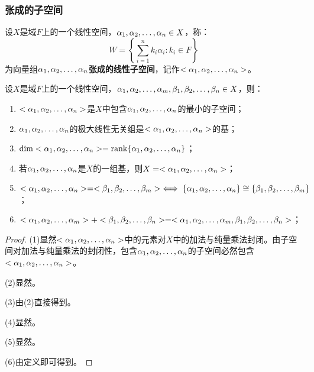 \subsubsection{张成的子空间}
\begin{definition}
	设$X$是域$F$上的一个线性空间，$\alpha_1, \alpha_2, \dots, \alpha_{n}\in X$，称：
	\begin{equation*}
		W=\left\{\sum_{i=1}^{n}k_i\alpha_i:k_i\in F\right\}
	\end{equation*}
	为向量组$\alpha_1, \alpha_2, \dots, \alpha_{n}$\textbf{张成的线性子空间}，记作$<\alpha_1, \alpha_2, \dots, \alpha_{n}>$。
\end{definition}
\begin{property}\label{prop:SpanSubspace}
	设$X$是域$F$上的一个线性空间，$\alpha_1, \alpha_2, \dots, \alpha_{m},\beta_1, \beta_2, \dots, \beta_{n}\in X$，则：
	\begin{enumerate}
		\item $<\alpha_1, \alpha_2, \dots, \alpha_{n}>$是$X$中包含$\alpha_1, \alpha_2, \dots, \alpha_{n}$的最小的子空间；
		\item $\alpha_1, \alpha_2, \dots, \alpha_{n}$的极大线性无关组是$<\alpha_1, \alpha_2, \dots, \alpha_{n}>$的基；
		\item $\operatorname{dim}<\alpha_1, \alpha_2, \dots, \alpha_{n}>=\operatorname{rank}\{\alpha_1, \alpha_2, \dots, \alpha_{n}\}$；
		\item 若$\alpha_1, \alpha_2, \dots, \alpha_{n}$是$X$的一组基，则$X=<\alpha_1, \alpha_2, \dots, \alpha_{n}>$；
		\item $<\alpha_1, \alpha_2, \dots, \alpha_{n}>=<\beta_1, \beta_2, \dots, \beta_{m}>\iff\{\alpha_1, \alpha_2, \dots, \alpha_{n}\}\cong\{\beta_1, \beta_2, \dots, \beta_{m}\}$；
		\item $<\alpha_1, \alpha_2, \dots, \alpha_{m}>+<\beta_1, \beta_2, \dots, \beta_{n}>=<\alpha_1, \alpha_2, \dots, \alpha_{m},\beta_1, \beta_2, \dots, \beta_{n}>$；
	\end{enumerate}
\end{property}
\begin{proof}
	(1)显然$<\alpha_1, \alpha_2, \dots, \alpha_{n}>$中的元素对$X$中的加法与纯量乘法封闭。由子空间对加法与纯量乘法的封闭性，包含$\alpha_1, \alpha_2, \dots, \alpha_{n}$的子空间必然包含$<\alpha_1, \alpha_2, \dots, \alpha_{n}>$。\par
	(2)显然。\par
	(3)由(2)直接得到。\par
	(4)显然。\par
	(5)显然。\par
	(6)由定义即可得到。
\end{proof}
